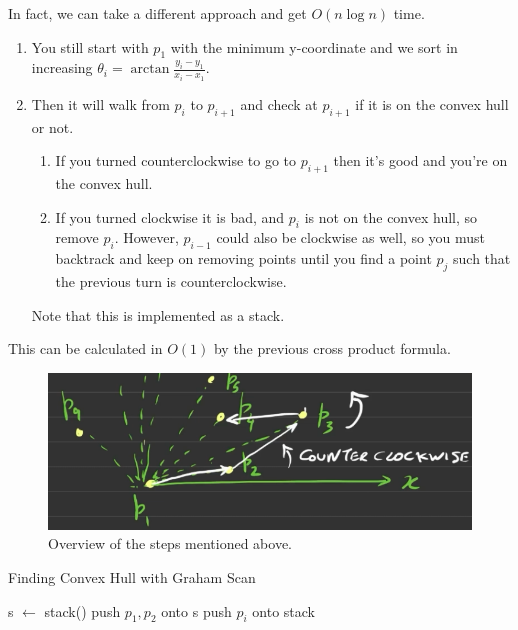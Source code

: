   \begin{example}
    In fact, we can take a different approach and get $O(n \log{n})$ time. 
    \begin{enumerate}
      \item You still start with $p_1$ with the minimum y-coordinate and we sort in increasing $\theta_i = \arctan \frac{y_i - y_1}{x_i - x_1}$. 
      \item Then it will walk from $p_i$ to $p_{i+1}$ and check at $p_{i+1}$ if it is on the convex hull or not. 
        \begin{enumerate}
          \item If you turned counterclockwise to go to $p_{i+1}$ then it's good and you're on the convex hull. 
          \item If you turned clockwise it is bad, and $p_i$ is not on the convex hull, so remove $p_i$. However, $p_{i-1}$ could also be clockwise as well, so you must backtrack and keep on removing points until you find a point $p_j$ such that the previous turn is counterclockwise. 
        \end{enumerate}
        Note that this is implemented as a stack. 
    \end{enumerate}
    This can be calculated in $O(1)$ by the previous cross product formula. 
    \begin{figure}[H]
      \centering 
      \includegraphics[scale=0.4]{img/graham.png}
      \caption{Overview of the steps mentioned above. } 
      \label{fig:graham}
    \end{figure}
    \begin{algorithm}[H]
      \caption{Finding Convex Hull with Graham Scan}
      \label{alg:graham}
      \begin{algorithmic}
          \State s $\gets$ stack()
          \State push $p_1, p_2$ onto s 
            \State push $p_i$ onto stack 

\end{algorithmic}
\end{algorithm}
\end{example}
